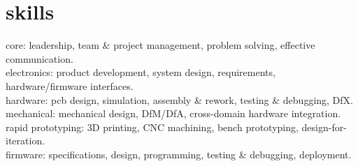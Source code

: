 
\section{skills}
  \vspace{-0.2cm}

{\headingfont core}: leadership, team \& project management, problem solving, effective communication.\\
{\headingfont electronics}: product development, system design, requirements, hardware/firmware interfaces.\\
{\headingfont hardware}: pcb design, simulation, assembly \& rework, testing \& debugging, DfX. \\
{\headingfont mechanical}: mechanical design, DfM/DfA, cross-domain hardware integration. \\
{\headingfont rapid prototyping}: 3D printing, CNC machining, bench prototyping, design-for-iteration. \\
{\headingfont firmware}: specifications, design, programming, testing \& debugging, deployment.